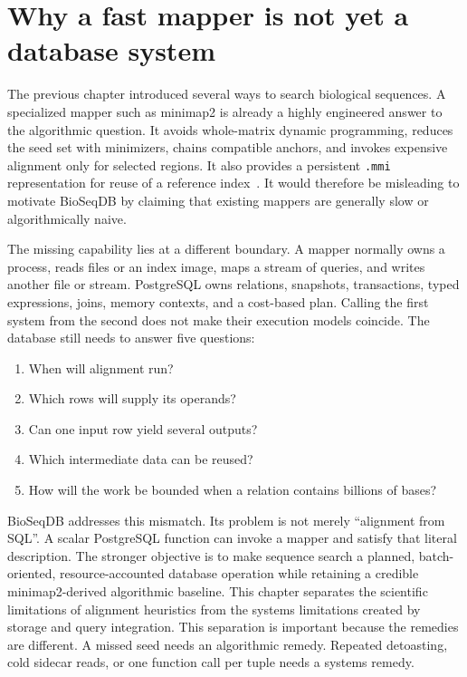 \section{Why a fast mapper is not yet a database system}
\label{sec:solution-gap-scope}

The previous chapter introduced several ways to search biological
sequences.  A specialized mapper such as minimap2 is already a highly
engineered answer to the algorithmic question.  It avoids whole-matrix
dynamic programming, reduces the seed set with minimizers, chains
compatible anchors, and invokes expensive alignment only for selected
regions.  It also provides a persistent \texttt{.mmi} representation for
reuse of a reference index~\cite{minimap2_paper}.
It would therefore be misleading to motivate
BioSeqDB by claiming that existing mappers are generally slow or
algorithmically naive.

The missing capability lies at a different boundary.  A mapper normally
owns a process, reads files or an index image, maps a stream of queries,
and writes another file or stream.  PostgreSQL owns relations, snapshots,
transactions, typed expressions, joins, memory contexts, and a
cost-based plan.  Calling the first system from the second does not make
their execution models coincide.  The database still needs to answer five
questions:
\begin{enumerate}
  \item When will alignment run?
  \item Which rows will supply its operands?
  \item Can one input row yield several outputs?
  \item Which intermediate data can be reused?
  \item How will the work be bounded when a relation contains billions of
  bases?
\end{enumerate}

BioSeqDB addresses this mismatch.  Its problem is not merely
``alignment from SQL''.  A scalar PostgreSQL function can invoke a mapper
and satisfy that literal description.  The stronger objective is to make
sequence search a planned, batch-oriented, resource-accounted database
operation while retaining a credible minimap2-derived algorithmic
baseline.  This chapter separates the scientific limitations of
alignment heuristics from the systems limitations created by storage and
query integration.  This separation is important because the remedies
are different.  A missed seed needs an algorithmic remedy.  Repeated
detoasting, cold sidecar reads, or one function call per tuple needs a
systems remedy.

